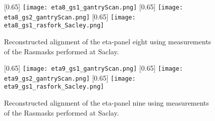 \documentclass[
twoside,            %
BCOR1.4cm,          %
10pt,               %
headings=normal,    %
headsepline,        %
clearplainpage,		%
final,              %
div=14,
open=right,
bibliography=toc
]{scrreprt}
\begin{document}
\begin{figure}[!h]
	\centering
	[0.65\textwidth]
	{\texttt{[image: eta8\_gs1\_gantryScan.png]}}
	\hfill
	[0.65\textwidth]
	{\texttt{[image: eta8\_gs2\_gantryScan.png]}}
	\hfill
	[0.65\textwidth]
	{\texttt{[image: eta8\_gs1\_rasfork\_Sacley.png]}}
	\vspace{-2mm}
	\caption{
		Reconstructed alignment of the eta-panel eight using measurements of the Rasmasks performed at Saclay.
	}
	\label{m8alignmentSacley}
\end{figure}


\begin{figure}[!h]
	\centering
	[0.65\textwidth]
	{\texttt{[image: eta9\_gs1\_gantryScan.png]}}
	\hfill
	[0.65\textwidth]
		{\texttt{[image: eta9\_gs2\_gantryScan.png]}}
	\hfill
	[0.65\textwidth]
	{\texttt{[image: eta9\_gs1\_rasfork\_Sacley.png]}}
	\vspace{-2mm}
	\caption{
		Reconstructed alignment of the eta-panel nine using measurements of the Rasmasks performed at Saclay.
	}
	\label{m9alignmentSacley}
\end{figure}
\end{document}

